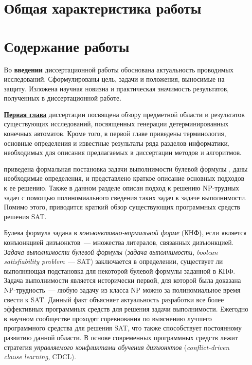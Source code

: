 
\section*{Общая характеристика работы} %



\newpage

\section*{Содержание работы}

Во \textbf{введении} диссертационной работы обоснована актуальность проводимых исследований. Сформулированы цель, задачи и положения, выносимые на защиту. Изложена научная новизна и практическая значимость результатов, полученных в диссертационной работе.


\textbf{\underline{Первая глава}} диссертации посвящена обзору предметной области и результатов существующих исследований, посвященных генерации детерминированных конечных автоматов.
Кроме того, в первой главе приведены терминология, основные определения и известные результаты ряда разделов информатики, необходимых для описания предлагаемых в диссертации методов и алгоритмов.

\insection{\ref{sec:review:sat}} приведена формальная постановка задачи выполнимости булевой формулы , даны необходимые определения, и представлено краткое описание основных подходов к ее решению.
Также в данном разделе описан подход к решению NP-трудных задач с помощью полиномиального сведения таких задач к задаче выполнимости.
Помимо этого, приводится краткий обзор существующих программных средств решения SAT.

Булева формула задана в \emph{конъюнктивно-нормальной форме} (КНФ), если является конъюнкцией дизъюнктов~--- множества литералов, связанных дизъюнкцией.
\emph{Задача выполнимости булевой формулы} (\emph{задача выполнимости}, \emph{boolean satisfiability problem}~{---} SAT) заключается в определении, существует ли выполняющая подстановка для некоторой булевой формулы заданной в КНФ.
Задача выполнимости является исторически первой, для которой была доказана NP-трудность~--- любую задачу из класса NP можно за полиномиальное время свести к SAT.
Данный факт объясняет актуальность разработки все более эффективных программных средств для решения задачи выполнимости.
Ежегодно в научном сообществе проходят соревнования по выяснению лучшего программного средства для решения SAT, что также способствует постоянному развитию данной области.
В основе современных программных средств лежит стратегия \emph{управляемого конфликтами обучения дизъюнктов} (\emph{conflict-driven clause learning}, CDCL).

